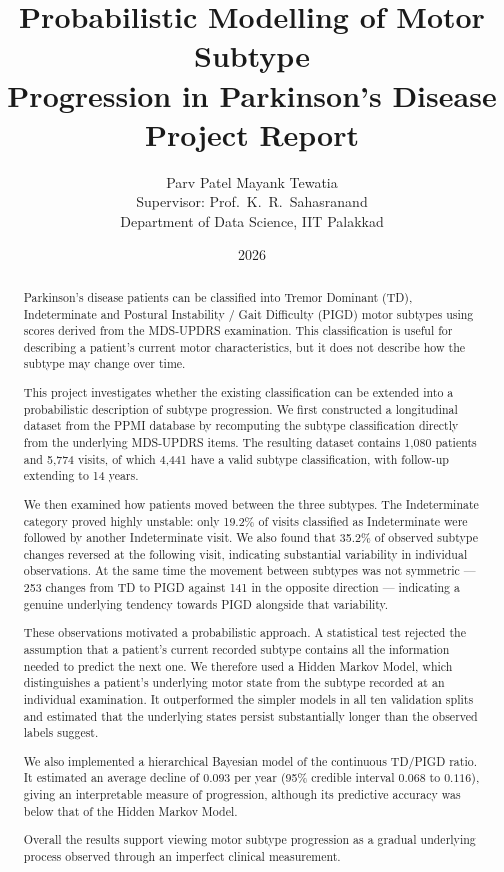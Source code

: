\documentclass[11pt,a4paper]{article}
\title{\textbf{Probabilistic Modelling of Motor Subtype\\
       Progression in Parkinson's Disease}\\[0.8em]
       \large Project Report}
\author{Parv Patel \quad\textbullet\quad Mayank Tewatia\\[0.5em]
        \small Supervisor: Prof.\ K.~R.\ Sahasranand\\
        \small Department of Data Science, IIT Palakkad}
\date{2026}
\begin{document}
\maketitle
\thispagestyle{empty}

\begin{abstract}
\noindent
Parkinson's disease patients can be classified into Tremor Dominant (TD),
Indeterminate and Postural Instability / Gait Difficulty (PIGD) motor subtypes
using scores derived from the MDS-UPDRS examination. This classification is
useful for describing a patient's current motor characteristics, but it does not
describe how the subtype may change over time.

This project investigates whether the existing classification can be extended
into a probabilistic description of subtype progression. We first constructed a
longitudinal dataset from the PPMI database by recomputing the subtype
classification directly from the underlying MDS-UPDRS items. The resulting
dataset contains 1{,}080 patients and 5{,}774 visits, of which 4{,}441 have a
valid subtype classification, with follow-up extending to 14 years.

We then examined how patients moved between the three subtypes. The
Indeterminate category proved highly unstable: only 19.2\% of visits classified
as Indeterminate were followed by another Indeterminate visit. We also found
that 35.2\% of observed subtype changes reversed at the following visit,
indicating substantial variability in individual observations. At the same time
the movement between subtypes was not symmetric --- 253 changes from TD to PIGD
against 141 in the opposite direction --- indicating a genuine underlying
tendency towards PIGD alongside that variability.

These observations motivated a probabilistic approach. A statistical test
rejected the assumption that a patient's current recorded subtype contains all
the information needed to predict the next one. We therefore used a Hidden
Markov Model, which distinguishes a patient's underlying motor state from the
subtype recorded at an individual examination. It outperformed the simpler
models in all ten validation splits and estimated that the underlying states
persist substantially longer than the observed labels suggest.

We also implemented a hierarchical Bayesian model of the continuous TD/PIGD
ratio. It estimated an average decline of $0.093$ per year (95\% credible
interval $0.068$ to $0.116$), giving an interpretable measure of progression,
although its predictive accuracy was below that of the Hidden Markov Model.

Overall the results support viewing motor subtype progression as a gradual
underlying process observed through an imperfect clinical measurement.
\end{abstract}
\end{document}

